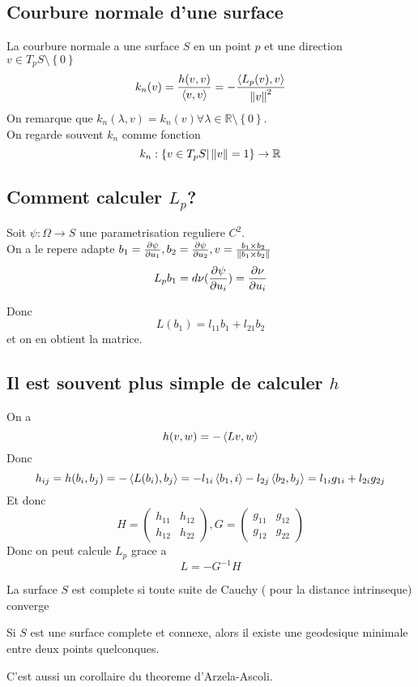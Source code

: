 \documentclass[../main.tex]{subfiles}
\begin{document}
\subsection{Courbure normale d'une surface}
\begin{defn}
La courbure normale a une surface $S$ en un point $p$ et une direction $v\in T_pS\setminus\left\{ 0 \right\} $ 	
\[ 
k_n( v) = \frac{h( v,v) }{\langle v,v\rangle} = - \frac{\left\langle L_p( v) ,v\right\rangle }{\left\lVert v\right\rVert^{2}}	
\]
On remarque que $k_n( \lambda,v) = k_n( v) \forall \lambda \in \mathbb{R}\setminus \left\{ 0 \right\} $.\\
On regarde souvent $k_n$ comme fonction 
\[ 
k_n : \left\{ v\in T_pS| \left\lVert v\right\rVert = 1  \right\} \to \mathbb{R}
\]


\end{defn}
\subsection*{Comment calculer $L_p$? }
Soit $\psi: \Omega\to S$ une parametrisation reguliere $C^{2}$.\\
On a le repere adapte $b_1= \frac{\partial\psi}{\partial u_1}, b_2= \frac{\partial\psi}{\partial u_2}, v= \frac{b_1\times b_2}{\left\lVert b_1\times b_2\right\rVert }	$
\[ 
L_p b_1= d\nu ( \frac{\partial \psi}{\partial u_i}) = \frac{\partial \nu}{\partial u_i}
\]

Donc
\[ 
L( b_1 ) = l_{11} b_1 + l_{21} b_2
\]
et on en obtient la matrice.\\
\subsection*{ Il est souvent plus simple de calculer $h$}
On a 
\[ 
h( v,w) = - \left\langle Lv, w\right\rangle 
\]
Donc
\[ 
h_{ij} = h( b_i, b_j) = - \left\langle L( b_i), b_j\right\rangle = - l_{1i} \left\langle b_1, i\right\rangle - l_{2j} \left\langle b_2, b_j\right\rangle = l_{1i} g_{1i} + l_{2i} g_{2j} 
\]
Et donc 
\[ 
H = 
\begin{pmatrix}
	h_{11} & h_{12}\\
	h_{12} & h_{22}
\end{pmatrix} , G = 
\begin{pmatrix}
	g_{11} &g_{12}\\
	g_{12} & g_{22}
\end{pmatrix} 
\]
Donc on peut calcule $L_p$ grace a 
\[ 
L= - G^{-1}H
\]
	
\begin{defn}
	La surface $S$ est complete si toute suite de Cauchy ( pour la distance intrinseque) converge
\end{defn}
\begin{thm}
Si $S$ est une surface complete et connexe, alors il existe une geodesique minimale entre deux points quelconques.	
\end{thm}
C'est aussi un corollaire du theoreme d'Arzela-Ascoli.
\end{document}

